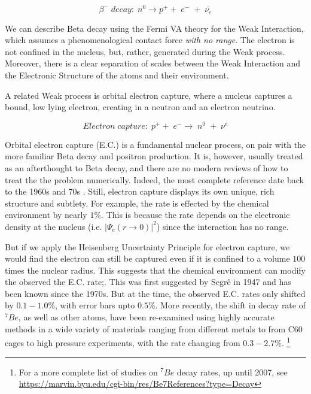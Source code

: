 \documentclass[%
 aip,
 jmp,%
 amsmath,amssymb,
 reprint,%
]{revtex4-1}
\begin{document}
$$\beta^{-}\;decay:\;n^{0}\rightarrow p^{+}+\;e^{-}\;+\;\bar{\nu_{e}}$$

We can describe Beta decay using the Fermi VA theory for the Weak Interaction, which assumes a phenomenological contact force \emph{with no range}.
The electron is not confined in the nucleus, but, rather, generated during the Weak process.  Moreover, there is a clear separation of scales between the Weak Interaction and the Electronic Structure of the atoms and their environment.

A related Weak process is orbital electron capture, where a nucleus captures a bound, low lying electron, creating in a neutron and an electron neutrino.

$$Electron\;capture:\;p^{+}+\;e^{-}\rightarrow\;n^{0}\;+\;\nu^{e}$$

Orbital electron capture (E.C.) is a fundamental  nuclear process, on pair with the more familiar Beta decay and positron production. It is, however, usually treated as an afterthought to Beta decay, and there are no modern reviews of how to treat the the problem numerically.  Indeed, the most complete reference date back to the 1960s and 70s \cite{ec-review1,ec-review2}.  Still, electron capture displays its own unique, rich structure and subtlety.  For example, the rate is effected by the chemical environment by nearly $1\%$. This is because the rate depends on the electronic density at the nucleus (i.e. $\vert\Psi_{e}(r\rightarrow 0)\vert^{2}$) since the interaction has no range. 

But if we apply the Heisenberg Uncertainty Principle for electron capture, we would find the electron can still be captured even if it is confined to a volume $100$ times the nuclear radius.    This suggests that the chemical environment can modify the observed the E.C. rate;.  This was first suggested by Segr\^{e} in 1947\cite{Segre021947} and has been known since the 1970s\cite{emery}. But at the time, the observed E.C. rates only shifted by $0.1-1.0\%$, with error bars upto $0.5\%$\cite{1999E&PSL.171..325H}.    More recently, the shift in decay rate of $^{7}Be$, as well as other atoms, have been re-examined using highly accurate methods in a wide variety of materials ranging from different metals to from C60 cages to high pressure experiments, with the rate changing from $0.3-2.7\%$.  \cite{RAY2009106, PhysRevC.101.035801,ohtsuki}\footnote{For a more complete list of studies on $^{7}Be$ decay rates, up until 2007, see \url{https://marvin.byu.edu/cgi-bin/res/Be7References?type=Decay} }
\end{document}
